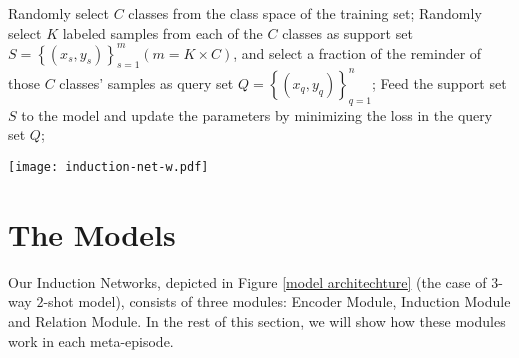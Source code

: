 \documentclass[11pt,a4paper]{article}
\begin{document}
\begin{algorithm}[t]
\caption{Episode-Based Meta Training}
\begin{algorithmic}[1]
\STATE Randomly select $C$ classes from the class space of the training set;
\STATE Randomly select $K$ labeled samples from each of the $C$ classes as support set 
$S = \left\{ {\left( {{x_s},{y_s}} \right)} \right\}_{s = 1}^m\left( {m = K \times C} \right)$, and select a fraction of the reminder of those $C$ classes' samples as query set $Q = \left\{ {\left( {{x_q},{y_q}} \right)} \right\}_{q = 1}^n$;
\STATE Feed the support set $S$ to the model and update the parameters by minimizing the loss in the query set $Q$;
\ENDFOR
\label{episode based meta training_alg}
\end{algorithmic}
\end{algorithm}

\begin{figure*}[t]
\centering
\small
\texttt{[image: induction-net-w.pdf]}
\caption{Induction Networks architecture for a $C$-way $K$-shot ($C=3$, $K=2$) problem with one query example}
\centering
\label{model architechture}
\end{figure*}

\section{The Models}
Our Induction Networks, depicted in Figure \ref{model architechture} (the case of $3$-way $2$-shot model), consists of three modules: Encoder Module, Induction Module and Relation Module. In the rest of this section, we will show how these modules work in each meta-episode. 
\end{document}
